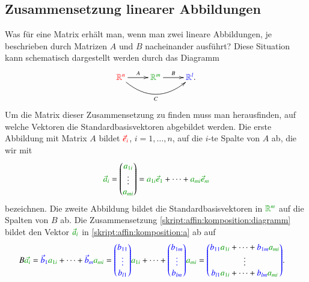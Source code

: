 \subsection{Zusammensetzung linearer Abbildungen}
Was für eine Matrix erhält man, wenn man zwei lineare Abbildungen,
je beschrieben durch Matrizen $A$ und $B$ nacheinander ausführt?
Diese Situation kann schematisch dargestellt werden durch das Diagramm
\begin{equation}
\definecolor{darkgreen}{rgb}{0,0.6,0}
\xymatrix{
{\color{red}\mathbb R^n } \ar[r]^{A} \ar@/_20pt/[rr]_{C}
&{\color{darkgreen}\mathbb R^m} \ar[r]^{B}
&{{\color{blue}\mathbb R^l}.}
}
\label{skript:affin:komposition:diagramm}
\end{equation}
Um die Matrix dieser Zusammensetzung zu finden muss man herausfinden,
auf welche Vektoren die Standardbasisvektoren abgebildet werden.
Die erste Abbildung mit Matrix $A$ bildet $\color{red}\vec{e}_i$,
$i=1,\dots,n$, auf die $i$-te Spalte von $A$ ab, die wir mit
\begin{equation}
\definecolor{darkgreen}{rgb}{0,0.6,0}
{\color{darkgreen}\vec{a}_i}
=\begin{pmatrix}
{\color{darkgreen}a_{1i}}\\\vdots\\{\color{darkgreen}a_{mi}}
\end{pmatrix}
=
{ \color{darkgreen} a_{1i} \vec{e}_1}
+\dots +
{ \color{darkgreen} a_{mi} \vec{e}_m}
\label{skript:affin:komposition:a}
\end{equation}
bezeichnen.
Die zweite Abbildung bildet die Standardbasisvektoren in
$\definecolor{darkgreen}{rgb}{0,0.6,0}
\color{darkgreen}\mathbb R^m$ auf die Spalten
von $B$ ab.
Die Zusammensetzung \eqref{skript:affin:komposition:diagramm}
bildet den Vektor 
$\definecolor{darkgreen}{rgb}{0,0.6,0}
\color{darkgreen}
\vec{a}_i$ in \eqref{skript:affin:komposition:a} 
ab auf 
{%
%
\begin{align*}
B{\color{darkgreen}\vec{a_i}}
&=
{\color{blue}\vec{b}_1} {\color{darkgreen}a_{1i}}+\dots
+{\color{blue}\vec{b}_m}{\color{darkgreen}a_{mi}}
=
{\color{blue}
\begin{pmatrix}b_{11}\\\vdots\\b_{l1}\end{pmatrix}} {\color{darkgreen}a_{1i}}
+\dots+
{\color{blue}
\begin{pmatrix}b_{1m}\\\vdots\\b_{lm}\end{pmatrix}} {\color{darkgreen}a_{mi}}
=
{\color{blue}
\begin{pmatrix}
\color{black}
{\color{blue}b_{11}}{\color{darkgreen}a_{1i}}+\dots+{\color{blue}b_{1m}}{\color{darkgreen}a_{mi}}\\
\color{black} \vdots\\
\color{black}
{\color{blue}b_{l1}}{\color{darkgreen}a_{1i}}+\dots+{\color{blue}b_{lm}}{\color{darkgreen}a_{mi}}\\
\end{pmatrix}
}.
\end{align*}}
